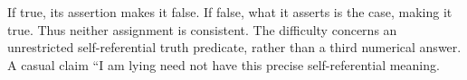 If true, its assertion makes it false. If false, what it asserts is the case, making it true. Thus neither assignment is consistent. The difficulty concerns an unrestricted self-referential truth predicate, rather than a third numerical answer. A casual claim ``I am lying need not have this precise self-referential meaning.
